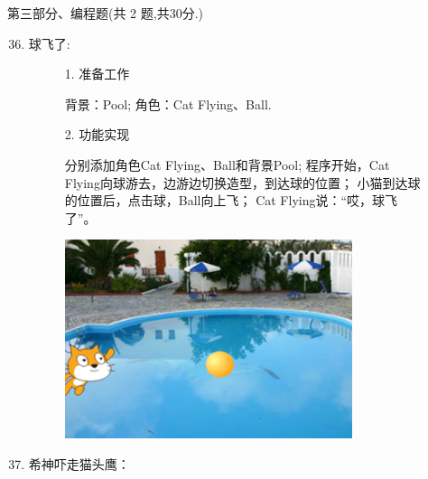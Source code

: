 \documentclass[10.5pt, a4paper]{article}
\begin{document}
    \newpage
    {\noindent\heiti 第三部分、编程题(共 2 题,共30分.)}
    \begin{enumerate}
        \setcounter{enumi}{35}
    
        \item 球飞了:
        \begin{figure}[htbp]
            \begin{minipage}{.6\textwidth}
                1. 准备工作
                \begin{tasks}[label = (\arabic*)]
                    \task 背景：Pool;
                    \task 角色：Cat Flying、Ball.
                \end{tasks}
                2. 功能实现
                \begin{tasks}[label = (\arabic*)]
                    \task 分别添加角色Cat Flying、Ball和背景Pool;
                    \task 程序开始，Cat Flying向球游去，边游边切换造型，到达球的位置；
                    \task 小猫到达球的位置后，点击球，Ball向上飞；
                    \task Cat Flying说：“哎，球飞了”。
                \end{tasks}
            \end{minipage}
            \begin{minipage}{.37\textwidth}
                \centering
                \includegraphics[width=\textwidth]{36.png}
            \end{minipage}
        \end{figure}

        \vfill
        \item 希神吓走猫头鹰：
        

\end{enumerate}
\end{document}
